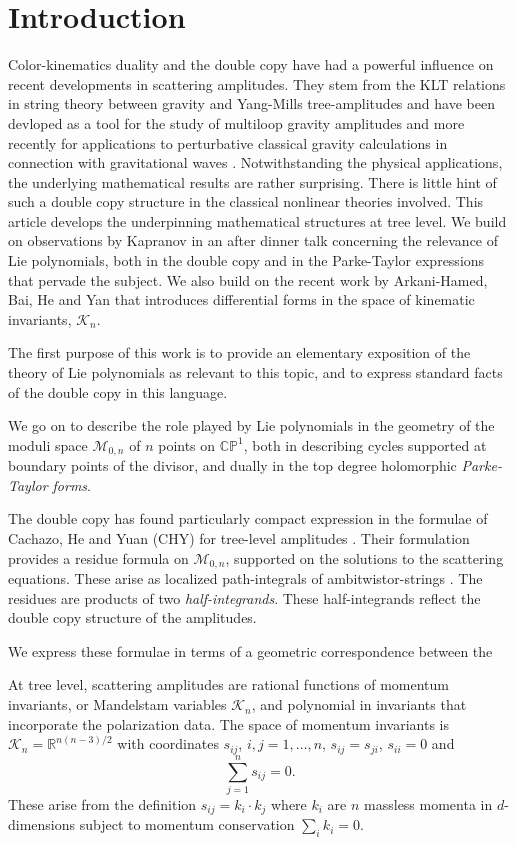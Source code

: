 \documentclass[11pt]{article}
\newcommand{\CP}{\mathbb{CP}}
\newcommand{\R}{\mathbb{R}}
\newcommand{\cK}{\mathcal{K}}
\newcommand{\cM}{\mathcal{M}}
\newcommand{\1}{{\rm 1\hskip-0.25em I}}
\begin{document}
\section{Introduction}
Color-kinematics duality and the double copy \cite{Bern:2008qj, Bern:2010ue} have had a powerful influence on recent developments in scattering amplitudes. They stem from the KLT relations in string theory \cite{Kawai:1985xq} between gravity and Yang-Mills tree-amplitudes and have been devloped as a  tool for the study of multiloop gravity amplitudes and more recently for applications to perturbative classical gravity calculations in connection with gravitational waves \cite{Bern:2019prr}.  Notwithstanding the physical applications, the underlying mathematical results are rather surprising.  There is little hint of such a double copy structure in the classical nonlinear theories involved.
This article develops the underpinning mathematical structures at tree level.  We  build on observations by Kapranov in an after dinner talk \cite{Kapranov} concerning the relevance of Lie polynomials, both in the double copy and in the Parke-Taylor expressions that pervade the subject.   We also build on the recent work by Arkani-Hamed, Bai, He and Yan \cite{Arkani-Hamed:2017mur} that introduces differential forms in the space of kinematic invariants, $\cK_n$.


The first purpose of this work is to provide an elementary exposition of the theory of Lie polynomials as relevant to this topic, and to express standard facts of the double copy in this language.  

We go on to describe the role played by Lie polynomials in the geometry of the moduli space $\cM_{0,n}$ of $n$ points on $\CP^1$, both in describing cycles supported at boundary points of the divisor, and dually in the top degree holomorphic \emph{Parke-Taylor forms}. 

The double copy has found particularly compact expression in the formulae of Cachazo, He and Yuan (CHY) for tree-level amplitudes \cite{Cachazo:2013hca}.   Their formulation provides a residue formula on $\cM_{0,n}$, supported on the solutions to the scattering equations.  These arise as localized path-integrals of ambitwistor-strings \cite{Mason:2013sva}.
  The residues are  products of two \emph{half-integrands}. These half-integrands reflect the double copy structure of the amplitudes.

We express these formulae in terms of a geometric correspondence between the 


At tree level, scattering amplitudes are rational functions of momentum invariants, or Mandelstam variables $\cK_n$, and polynomial in invariants that incorporate the polarization data.  The space of momentum invariants is $\cK_n=\R^{n(n-3)/2}$ with coordinates $s_{ij}$, $i,j=1,\ldots , n$, $s_{ij}=s_{ji}$, $s_{ii}=0$ and 
\begin{equation}
\sum_{j=1}^n s_{ij} = 0. \label{conservation}
\end{equation}
These arise from  the definition $s_{ij}=k_i\cdot k_j$ where $k_i$ are $n$ massless momenta in $d$-dimensions subject to momentum conservation $\sum_i k_i=0$.
\end{document}
